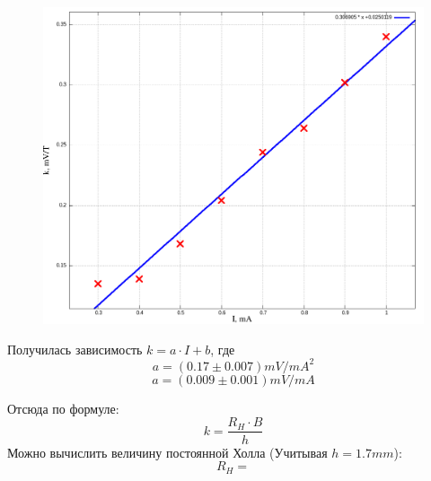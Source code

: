 \documentclass{article}
\begin{document}
\begin{figure}[H]
    \centering
    \includegraphics[width=\textwidth]{k-I.png}
\end{figure}

Получилась зависимость \( k = a \cdot I + b \), где
\[ a = (0.17 \pm 0.007) mV/mA^2 \]
\[ a = (0.009 \pm 0.001) mV/mA \]

Отсюда по формуле:
\[ k = \frac{R_H\cdot B}{h} \]
Можно вычислить величину постоянной Холла (Учитывая \(h = 1.7 mm\)):
\[ R_H = \]
\end{document}
